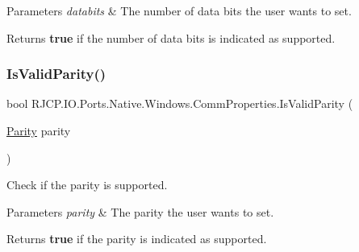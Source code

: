 \begin{DoxyParams}{Parameters}
{\em databits} & The number of data bits the user wants to set.\\
\hline
\end{DoxyParams}
\begin{DoxyReturn}{Returns}
{\bfseries{true}} if the number of data bits is indicated as supported.
\end{DoxyReturn}
\mbox{\label{class_r_j_c_p_1_1_i_o_1_1_ports_1_1_native_1_1_windows_1_1_comm_properties_a5eaedb3f4a21a4f8ff2b33ed00c65e8a}} 
\subsubsection{\texorpdfstring{IsValidParity()}{IsValidParity()}}
{\footnotesize\ttfamily bool R\+J\+C\+P.\+I\+O.\+Ports.\+Native.\+Windows.\+Comm\+Properties.\+Is\+Valid\+Parity (\begin{DoxyParamCaption}\item[{\mbox{\hyperlink{namespace_r_j_c_p_1_1_i_o_1_1_ports_a35c8c760a80dd0392e605dd3ad169954}{Parity}}}]{parity }\end{DoxyParamCaption})}



Check if the parity is supported. 


\begin{DoxyParams}{Parameters}
{\em parity} & The parity the user wants to set.\\
\hline
\end{DoxyParams}
\begin{DoxyReturn}{Returns}
{\bfseries{true}} if the parity is indicated as supported.
\end{DoxyReturn}
\mbox{\label{class_r_j_c_p_1_1_i_o_1_1_ports_1_1_native_1_1_windows_1_1_comm_properties_a0afc93c2b4e0bf52a173a24e7bd2906e}} 
